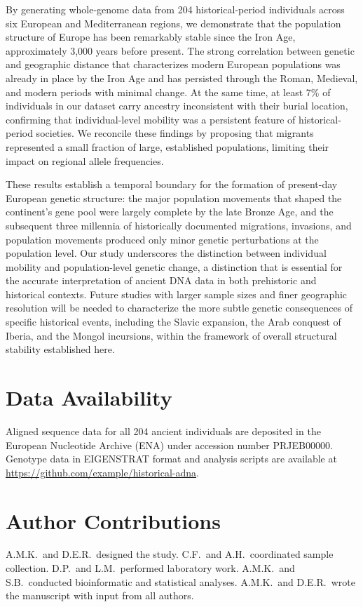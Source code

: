 \documentclass[11pt,a4paper]{article}
\begin{document}
By generating whole-genome data from 204 historical-period individuals across six European and Mediterranean regions, we demonstrate that the population structure of Europe has been remarkably stable since the Iron Age, approximately 3,000 years before present. The strong correlation between genetic and geographic distance that characterizes modern European populations was already in place by the Iron Age and has persisted through the Roman, Medieval, and modern periods with minimal change. At the same time, at least 7\% of individuals in our dataset carry ancestry inconsistent with their burial location, confirming that individual-level mobility was a persistent feature of historical-period societies. We reconcile these findings by proposing that migrants represented a small fraction of large, established populations, limiting their impact on regional allele frequencies.

These results establish a temporal boundary for the formation of present-day European genetic structure: the major population movements that shaped the continent's gene pool were largely complete by the late Bronze Age, and the subsequent three millennia of historically documented migrations, invasions, and population movements produced only minor genetic perturbations at the population level. Our study underscores the distinction between individual mobility and population-level genetic change, a distinction that is essential for the accurate interpretation of ancient DNA data in both prehistoric and historical contexts. Future studies with larger sample sizes and finer geographic resolution will be needed to characterize the more subtle genetic consequences of specific historical events, including the Slavic expansion, the Arab conquest of Iberia, and the Mongol incursions, within the framework of overall structural stability established here.

\section*{Data Availability}
Aligned sequence data for all 204 ancient individuals are deposited in the European Nucleotide Archive (ENA) under accession number PRJEB00000. Genotype data in EIGENSTRAT format and analysis scripts are available at \url{https://github.com/example/historical-adna}.

\section*{Author Contributions}
A.M.K.\ and D.E.R.\ designed the study. C.F.\ and A.H.\ coordinated sample collection. D.P.\ and L.M.\ performed laboratory work. A.M.K.\ and S.B.\ conducted bioinformatic and statistical analyses. A.M.K.\ and D.E.R.\ wrote the manuscript with input from all authors.
\end{document}
